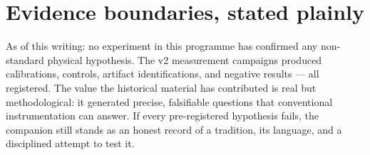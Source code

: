 \documentclass[10pt,letterpaper]{article}
\begin{document}
\section{Evidence boundaries, stated plainly}
As of this writing: no experiment in this programme has confirmed any
non-standard physical hypothesis. The v2 measurement campaigns produced
calibrations, controls, artifact identifications, and negative results
--- all registered. The value the historical material has contributed is
real but methodological: it generated precise, falsifiable questions
that conventional instrumentation can answer. If every pre-registered
hypothesis fails, the companion still stands as an honest record of a
tradition, its language, and a disciplined attempt to test it.



\end{document}
